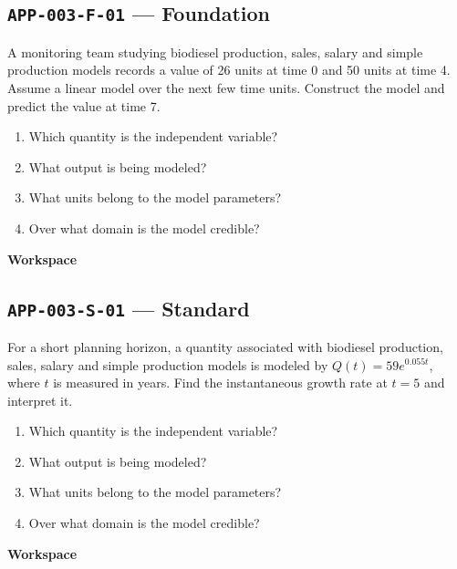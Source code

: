 \documentclass[11pt]{book}
\newcommand{\pid}[1]{\texttt{#1}}
\newcommand{\workspace}{\par\vspace{0.7in}\hrulefill\par\vspace{0.55in}\hrulefill\par}
\begin{document}
\subsection*{\pid{APP-003-F-01} — Foundation}
\begin{problembox}
A monitoring team studying biodiesel production, sales, salary and simple production models records a value of 26 units at time 0 and 50 units at time 4. Assume a linear model over the next few time units. Construct the model and predict the value at time 7.
\end{problembox}
\begin{promptbox}\begin{enumerate}
\item Which quantity is the independent variable?
\item What output is being modeled?
\item What units belong to the model parameters?
\item Over what domain is the model credible?
\end{enumerate}\end{promptbox}
\textbf{Workspace}\workspace
{}
\subsection*{\pid{APP-003-S-01} — Standard}
\begin{problembox}
For a short planning horizon, a quantity associated with biodiesel production, sales, salary and simple production models is modeled by $Q(t)=59e^{0.055t}$, where $t$ is measured in years. Find the instantaneous growth rate at $t=5$ and interpret it.
\end{problembox}
\begin{promptbox}\begin{enumerate}
\item Which quantity is the independent variable?
\item What output is being modeled?
\item What units belong to the model parameters?
\item Over what domain is the model credible?
\end{enumerate}\end{promptbox}
\textbf{Workspace}\workspace
{}
\end{document}
